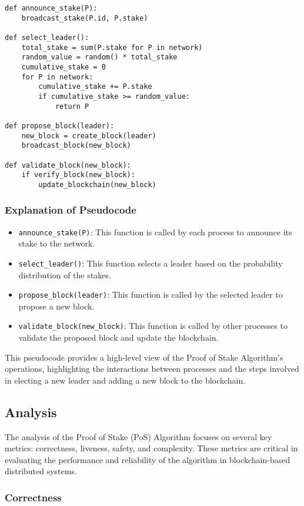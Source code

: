 \begin{verbatim}
def announce_stake(P):
    broadcast_stake(P.id, P.stake)

def select_leader():
    total_stake = sum(P.stake for P in network)
    random_value = random() * total_stake
    cumulative_stake = 0
    for P in network:
        cumulative_stake += P.stake
        if cumulative_stake >= random_value:
            return P

def propose_block(leader):
    new_block = create_block(leader)
    broadcast_block(new_block)

def validate_block(new_block):
    if verify_block(new_block):
        update_blockchain(new_block)
\end{verbatim}

\subsubsection{Explanation of Pseudocode}

\begin{itemize}
    \item \texttt{announce\_stake(P)}: This function is called by each process to announce its stake to the network.
    \item \texttt{select\_leader()}: This function selects a leader based on the probability distribution of the stakes.
    \item \texttt{propose\_block(leader)}: This function is called by the selected leader to propose a new block.
    \item \texttt{validate\_block(new\_block)}: This function is called by other processes to validate the proposed block and update the blockchain.
\end{itemize}
This pseudocode provides a high-level view of the Proof of Stake Algorithm's operations, highlighting the interactions between processes and the steps involved in electing a new leader and adding a new block to the blockchain.

\subsection{Analysis}
The analysis of the Proof of Stake (PoS) Algorithm focuses on several key metrics: correctness, liveness, safety, and complexity. These metrics are critical in evaluating the performance and reliability of the algorithm in blockchain-based distributed systems.

\subsubsection{Correctness}

